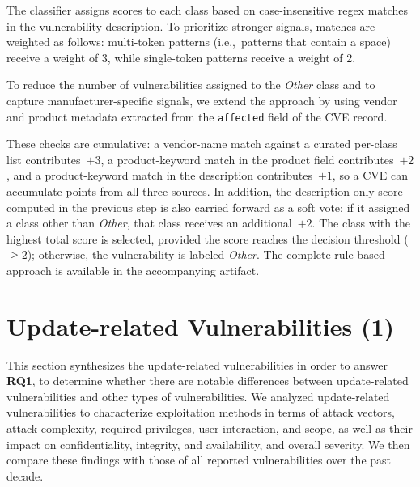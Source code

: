 \documentclass[fleqn,s1,names,tex]{neptune}
\begin{document}
The classifier assigns scores to each class based on case-insensitive regex matches in the vulnerability description. 
To prioritize stronger signals, matches are weighted as follows:  multi-token patterns (i.e.,~patterns that contain a space) receive a weight of 3, while single-token patterns receive a weight of 2.






To reduce the number of vulnerabilities assigned to the \textit{Other} class and to capture manufacturer-specific signals, we extend the approach by using vendor and product metadata extracted from the \texttt{affected} field of the CVE record. 

These checks are cumulative: a vendor-name match against a curated per-class list contributes~$+3$, a product-keyword match in the product field contributes~$+2$, and a product-keyword match in the description contributes~$+1$, so a CVE can accumulate points from all three sources.
In addition, the description-only score computed in the previous step is also carried forward as a soft vote: if it assigned a class other than \textit{Other}, that class receives an additional~$+2$.
The class with the highest total score is selected, provided the score reaches the decision threshold (${\geq}2$); otherwise, the vulnerability is labeled \textit{Other}.
The complete rule-based approach is available in the accompanying artifact.


\section{Update-related Vulnerabilities  ({}1)}






 This section synthesizes the update-related vulnerabilities in order to answer \textbf{RQ1}, to determine whether there are notable differences between update-related vulnerabilities and other types of vulnerabilities.  
We analyzed update-related vulnerabilities to characterize exploitation methods in terms of attack vectors, attack complexity, required privileges, user interaction, and scope, as well as their impact on confidentiality, integrity, and availability, and overall severity. We then compare these findings with those of all reported vulnerabilities over the past decade.
    
\end{document}
